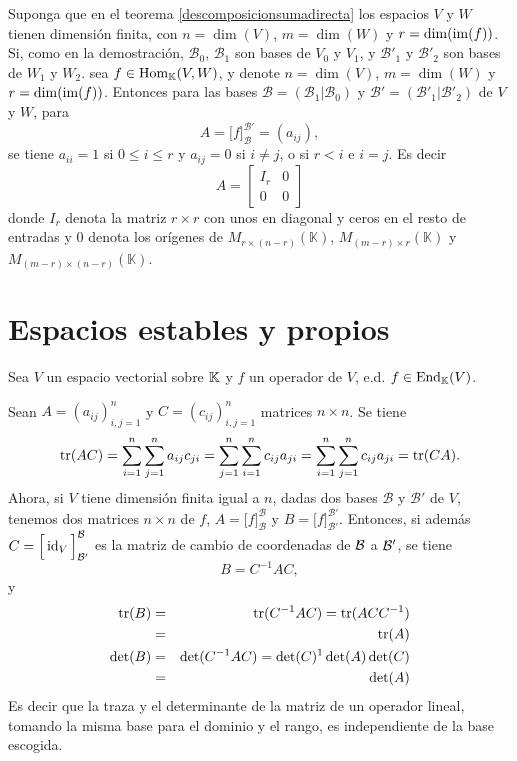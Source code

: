 \begin{obs}
Suponga que en el teorema \ref{descomposicionsumadirecta} los espacios $V$ y $W$ tienen dimensi\'on finita, con $n=\dim(V)$, $m=\dim(W)$ y $r=\dim(\operatorname{im}(f))$. Si, como en la demostración, $\mathcal{B}_0$, $\mathcal{B}_1$ son bases de $V_0$ y $V_1$, y $\mathcal{B}'_1$ y $\mathcal{B}'_2$ son bases de $W_1$ y $W_2$. sea $f\in\operatorname{Hom}_\mathbb{K}(V,W)$, y denote $n=\dim(V)$, $m=\dim(W)$ y $r=\dim(\operatorname{im}(f))$. Entonces para las bases $\mathcal{B}=\left(\mathcal{B}_1|\mathcal{B}_0\right)$ y $\mathcal{B}'=\left(\mathcal{B}'_1|\mathcal{B}'_2\right)$ de $V$ y $W$, para
\[
A=\Big[f\Big]^{\mathcal{B}'}_{\mathcal{B}}=(a_{ij}),
\]
se tiene $a_{ii}=1$ si $0\le i\le r$ y $a_{ij}=0$ si $i\ne j$, o si $r<i$ e $i=j$. Es decir
\[
A=\left[\begin{array}{c|c}
I_r & 0\\
\hline
0   & 0
\end{array}\right]
\]
donde $I_r$ denota la matriz $r\times r$ con unos en diagonal y ceros en el resto de entradas y $0$ denota los or\'igenes de $M_{r\times (n-r)}(\mathbb{K})$, $M_{(m-r)\times r}(\mathbb{K})$ y $M_{(m-r)\times(n-r)}(\mathbb{K})$.
\end{obs}

\section{Espacios estables y propios}

Sea $V$ un espacio vectorial sobre $\mathbb{K}$ y $f$ un operador de $V$, e.d. $f\in\operatorname{End}_{\mathbb{K}}(V)$.

\begin{obs}
Sean $A=(a_{ij})_{i,j=1}^n$ y $C=(c_{ij})_{i,j=1}^n$ matrices $n\times n$. Se tiene
\[
  \operatorname{tr}(AC)=\sum_{i=1}^n\sum_{j=1}^na_{ij}c_{ji}=\sum_{j=1}^n\sum_{i=1}^nc_{ij}a_{ji}=\sum_{i=1}^n\sum_{j=1}^nc_{ij}a_{ji}=\operatorname{tr}(CA).
\]
Ahora, si $V$ tiene dimensi\'on finita igual a $n$, dadas dos bases $\mathcal{B}$ y $\mathcal{B}'$ de $V$, tenemos dos matrices $n\times n$ de $f$, $A=\Big[f\Big]^{\mathcal{B}}_{\mathcal{B}}$ y $B=\Big[f\Big]^{\mathcal{B}'}_{\mathcal{B}'}$. Entonces, si adem\'as $C=\Big[\operatorname{id}_V\Big]_{\mathcal{B}'}^{\mathcal{B}}$ es la matriz de cambio de coordenadas de $\mathcal{B}$ a $\mathcal{B}'$, se tiene
\[
  B=C^{-1}AC,
\]
y
\begin{eqnarray*}
  \operatorname{tr}(B) & = &\operatorname{tr}(C^{-1}AC)=\operatorname{tr}(ACC^{-1})\\
           & = &\operatorname{tr}(A)\\
  \det(B) & = & \det(C^{-1}AC)=\det(C)^{1}\det(A)\det(C)\\
             & = &\det(A)
\end{eqnarray*}
Es decir que la traza y el determinante de la matriz de un operador lineal, tomando la misma base para el dominio y el rango, es independiente de la base escogida.
\end{obs}

